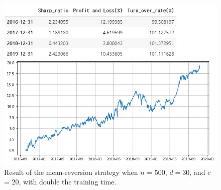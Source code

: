 \documentclass[11pt]{article}
\begin{document}
\begin{figure}
    \centering
    \includegraphics[width=\textwidth/4*3]{images/capt2.png}
    \caption{Result of the mean-reversion strategy when $n$ = 500, $d = 30$, and $c$ = 20, with double the training time.}
    \label{deep result 3}
    \vspace*{-5mm}
\end{figure}
\end{document}
